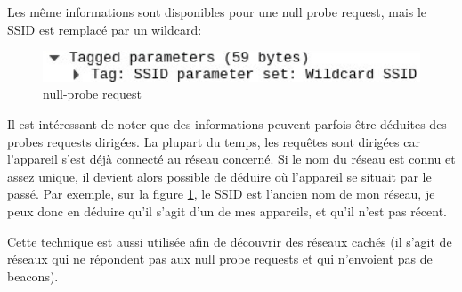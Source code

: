 Les même informations sont disponibles pour une null probe request, mais le SSID est remplacé par un wildcard:
\begin{figure}[H]
	\centering
	\includegraphics[width=14cm]{images/probe/null_probe_cropped.png}
	\caption{null-probe request}
	\label{fig:directedprobe}
\end{figure}

Il est intéressant de noter que des informations peuvent parfois être déduites des probes requests dirigées.
La plupart du temps, les requêtes sont dirigées car l'appareil s'est déjà connecté au réseau concerné. 
Si le nom du réseau est connu et assez unique, il devient alors possible de déduire où l'appareil se situait par le passé.
Par exemple, sur la figure \ref{fig:directedprobe}, le SSID est l'ancien nom de mon réseau, je peux donc en déduire qu'il s'agit
d'un de mes appareils, et qu'il n'est pas récent. 

Cette technique est aussi utilisée afin de découvrir des réseaux cachés (il s'agit de réseaux qui ne répondent pas aux null probe requests et qui n'envoient pas de beacons).


